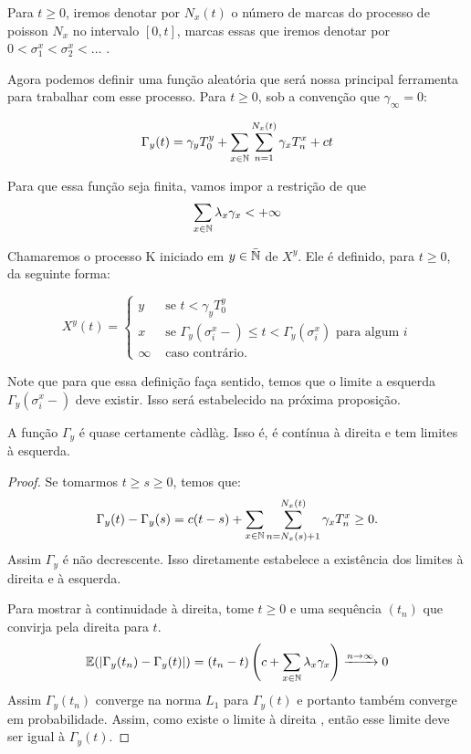 Para $t \geq 0$, iremos denotar por $N_x(t)$ o número de marcas do
processo de poisson  $N_x$ no intervalo $[0, t]$, marcas essas que
iremos denotar por $0 < \sigma_1^x < \sigma_2^x < \ldots$ .

Agora podemos definir uma função aleatória que será nossa principal
ferramenta para trabalhar com esse processo. Para $t \geq 0$, sob a
convenção que $\gamma_\infty = 0$:

\begin{equation}
  \label{def:Gamma}
  \Gamma_y (t) = \gamma_y T_0^y
  + \sum_{x \in {\mathbb{N}}} \sum_{n = 1}^{N_x(t)}
  \gamma_x T_n^x
  + ct
\end{equation}

Para que essa função seja \qc finita, vamos impor a restrição de que
\begin{equation}
  \sum_{x \in {\mathbb{N}}} \lambda_x\gamma_x < +\infty
\end{equation}

Chamaremos o processo K iniciado em $y \in {\bar{{\mathbb{N}}}}$ de $X^y$. Ele é
definido, para $t \geq 0$, da seguinte forma:

\begin{equation}
  \label{def:procK}
  X^y (t) =
  \begin{cases}
    y & \textrm{ se }  t < \gamma_y T_0^y\\
    x & \textrm{ se }  \Gamma_y(\sigma_i^x-) \leq t < \Gamma_y(\sigma^x_i)
       \textrm{ para algum } i \\
    \infty & \textrm{ caso contrário.}
  \end{cases}
\end{equation}

Note que para que essa definição faça sentido, temos que o limite a
esquerda $\Gamma_y (\sigma_i^x-)$ deve existir. Isso será estabelecido
na próxima proposição.

\begin{proposicao}
  \label{prop:gamma-cadlag}
  A função $\Gamma_y$ é quase certamente càdlàg. Isso é, é contínua à
  direita e tem limites à esquerda.
\end{proposicao}
\begin{proof}
  Se tomarmos $t \geq s \geq 0$, temos que:
  \begin{equation*}
    \Gamma_y(t) - \Gamma_y(s) = 
    c (t - s) + 
    \sum_{x \in {\mathbb{N}}} \sum_{n = N_x(s)+1}^{N_x(t)} \gamma_x T^x_n
    \geq 0 .
  \end{equation*}
  Assim $\Gamma_y$ é não decrescente. Isso diretamente estabelece a
  existência dos limites à direita e à esquerda.


  Para mostrar à continuidade à direita, tome $t \geq 0$ e uma
  sequência $(t_n)$ que convirja pela direita para $t$.
  \begin{equation*}
    {\mathbb{E}}(|\Gamma_y(t_n) - \Gamma_y(t)|) =
    (t_n - t) \left(
      c + 
      \sum_{x \in {\mathbb{N}}}\lambda_x \gamma_x 
    \right) \xrightarrow{n \to \infty} 0 
  \end{equation*}
  Assim $\Gamma_y(t_n)$ converge na norma $L_1$ para $\Gamma_y(t)$ e
  portanto também converge em probabilidade. Assim, como existe o limite à
  direita \qc, então esse limite deve ser igual à $\Gamma_y(t)$.


\end{proof}


